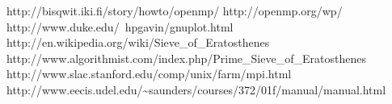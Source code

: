 \documentclass[a4paper]{article}
\begin{document}
\begin{thebibliography}{99}
	http://bisqwit.iki.fi/story/howto/openmp/
	http://openmp.org/wp/
	http://www.duke.edu/~hpgavin/gnuplot.html
	 http://en.wikipedia.org/wiki/Sieve\_of\_Eratosthenes
	 http://www.algorithmist.com/index.php/Prime\_Sieve\_of\_Eratosthenes
	 http://www.slac.stanford.edu/comp/unix/farm/mpi.html
	 http://www.eecis.udel.edu/\~{}saunders/courses/372/01f/manual/manual.html
\end{thebibliography}
\end{document}
